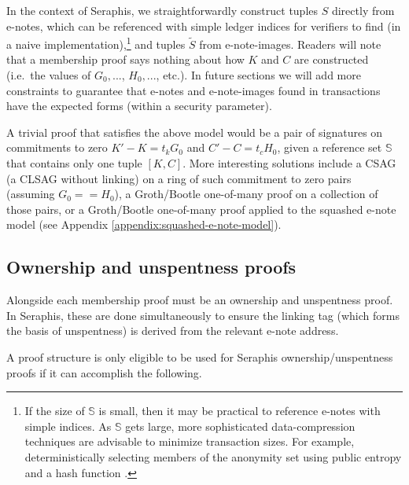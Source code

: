 In the context of Seraphis, we straightforwardly construct tuples $S$ directly from e-notes, which can be referenced with simple ledger indices for verifiers to find (in a naive implementation),\footnote{If the size of $\mathbb{S}$ is small, then it may be practical to reference e-notes with simple indices. As $\mathbb{S}$ gets large, more sophisticated data-compression techniques are advisable to minimize transaction sizes. For example, deterministically selecting members of the anonymity set using public entropy and a hash function \cite{chator-green-how-to-squeeze-crowd}.} and tuples $\tilde{S}$ from e-note-images. Readers will note that a membership proof says nothing about how $K$ and $C$ are constructed (i.e.\ the values of $G_0,...$, $H_0,...$, etc.). In future sections we will add more constraints to guarantee that e-notes and e-note-images found in transactions have the expected forms (within a security parameter).

A trivial proof that satisfies the above model would be a pair of signatures on commitments to zero $K' - K = t_k G_0$ and $C' - C = t_c H_0$, given a reference set $\mathbb{S}$ that contains only one tuple $[K, C]$. More interesting solutions include a CSAG (a CLSAG \cite{clsag-eprint} without linking) on a ring of such commitment to zero pairs (assuming $G_0 == H_0$), a Groth/Bootle one-of-many proof \cite{bootle-one-of-many, triptych-preprint, lelantus-spark} on a collection of those pairs, or a Groth/Bootle one-of-many proof applied to the squashed e-note model (see Appendix \ref{appendix:squashed-e-note-model}).


\subsection{Ownership and unspentness proofs}
\label{subsec:seraphis-ownership-unspentness-proofs}

Alongside each membership proof must be an ownership and unspentness proof. In Seraphis, these are done simultaneously to ensure the linking tag (which forms the basis of unspentness) is derived from the relevant e-note address.

A proof structure is only eligible to be used for Seraphis ownership/unspentness proofs if it can accomplish the following.

